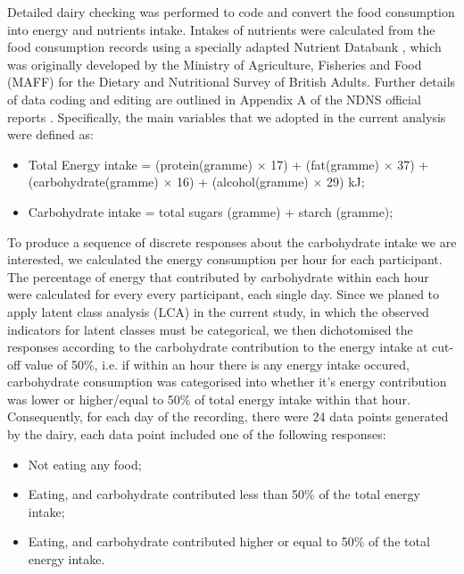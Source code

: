 Detailed dairy checking was performed to code and convert the food consumption into energy and nutrients intake. Intakes of nutrients were calculated from the food consumption records using a specially adapted Nutrient Databank \parencite{smithers1993maff}, which was originally developed by the Ministry of Agriculture, Fisheries and Food (MAFF) for the Dietary and Nutritional Survey of British Adults. Further details of data
coding and editing are outlined in Appendix A of the NDNS official reports \parencite{NDNSofficial}. Specifically, the main variables that we adopted in the current analysis were defined as: 

\begin{itemize}
	\item Total Energy intake = (protein(gramme) $\times$ 17) + (fat(gramme) $\times$ 37) + (carbohydrate(gramme) $\times$ 16) + (alcohol(gramme) $\times$ 29)  kJ;
	\item Carbohydrate intake = total sugars (gramme) + starch (gramme); 
\end{itemize}

To produce a sequence of discrete responses about the carbohydrate intake we are interested, we calculated the energy consumption per hour for each participant. The percentage of energy that contributed by carbohydrate within each hour were calculated for every every participant, each single day. Since we planed to apply latent class analysis (LCA) in the current study, in which the observed indicators for latent classes must be categorical, we then dichotomised the responses according to the carbohydrate contribution to the energy intake at cut-off value of 50\%, i.e. if within an hour there is any energy intake occured, carbohydrate consumption was categorised into whether it's energy contribution was lower or higher/equal to 50\% of total energy intake within that hour. Consequently, for each day of the recording, there were 24 data points generated by the dairy, each data point included one of the following responses:

\begin{itemize}
	\item Not eating any food; 
	\item Eating, and carbohydrate contributed less than 50\% of the total energy intake;
	\item Eating, and carbohydrate contributed higher or equal to 50\% of the total energy intake.
\end{itemize}
\vspace{-0.5cm}


